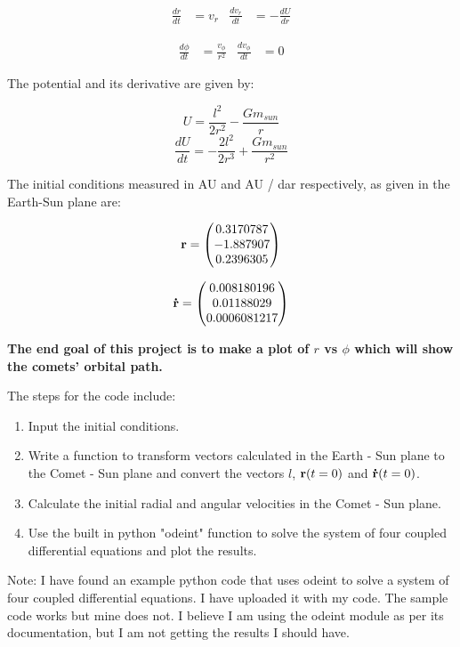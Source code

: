 \documentclass[11pt]{amsart}
\begin{document}
\begin{align}
  \frac{dr}{dt} &= v_r
 &
  \frac{d v_r}{dt} &= - \frac{d U}{dr}
\end{align}

\begin{align}
 \frac{d \phi}{dt} &= \frac{v_{\phi}}{r^2}
 &  \frac{d v_{\phi} }{dt} &= 0
\end{align}
\vspace{2 mm}

The potential and its derivative are given by:

\begin{equation}
U = \frac{l^2}{2 r^2} - \frac{Gm_{sun}}{r} 
\end{equation}
\begin{equation}
\frac{d U}{d t} = - \frac{2l^2}{2 r^3} + \frac{Gm_{sun}}{r^2}
\end{equation}
\vspace{2 mm}

The initial conditions measured in AU and AU / dar respectively, as given in the Earth-Sun plane are:

\[
\bold r = 
  \begin{pmatrix} 0.3170787 \\ -1.887907 \\ 0.2396305 \end{pmatrix}
\]

\[
\bold{\dot r} = 
  \begin{pmatrix} 0.008180196 \\ 0.01188029 \\ 0.0006081217 \end{pmatrix}
\]
\vspace{2 mm}
\vspace{2 mm}

\textbf{The end goal of this project is to make a plot of $r$ vs $\phi$ which will show the comets' orbital path.}
\newline

\vspace{3 mm}

The steps for the code include:
\begin{enumerate}
\item Input the initial conditions.  
\item Write a function to transform vectors calculated in the Earth - Sun plane to the Comet - Sun plane and convert the vectors $l$, $\bold{r}(t=0)$ and $\bold{\dot r}(t=0)$.
\item Calculate the initial radial and angular velocities in the Comet - Sun plane.
\item Use the built in python "odeint" function to solve the system of four coupled differential equations and plot the results.
\end{enumerate}

Note: I have found an example python code that uses odeint to solve a system of four coupled differential equations.  I have uploaded it with my code.  The sample code works but mine does not.  I believe I am using the odeint module as per its documentation, but I am not getting the results I should have.
\end{document}
